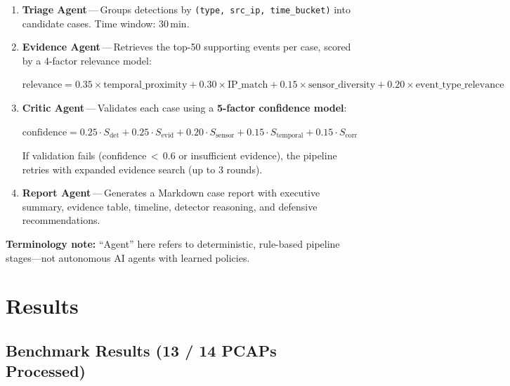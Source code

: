 \documentclass[11pt, a4paper]{article}
\begin{document}
\begin{enumerate}[itemsep=4pt]
    \item \textbf{Triage Agent}\,---\,Groups detections by \texttt{(type, src\_ip, time\_bucket)} into candidate cases. Time window: 30\,min.

    \item \textbf{Evidence Agent}\,---\,Retrieves the top-50 supporting events per case, scored by a 4-factor relevance model:
    \begin{center}\small
    $\text{relevance} = 0.35 \times \text{temporal\_proximity} + 0.30 \times \text{IP\_match} + 0.15 \times \text{sensor\_diversity} + 0.20 \times \text{event\_type\_relevance}$
    \end{center}

    \item \textbf{Critic Agent}\,---\,Validates each case using a \textbf{5-factor confidence model}:
    \begin{center}\small
    $\text{confidence} = 0.25 \cdot S_{\text{det}} + 0.25 \cdot S_{\text{evid}} + 0.20 \cdot S_{\text{sensor}} + 0.15 \cdot S_{\text{temporal}} + 0.15 \cdot S_{\text{corr}}$
    \end{center}
    If validation fails (confidence\,$<$\,0.6 or insufficient evidence), the pipeline retries with expanded evidence search (up to 3 rounds).

    \item \textbf{Report Agent}\,---\,Generates a Markdown case report with executive summary, evidence table, timeline, detector reasoning, and defensive recommendations.
\end{enumerate}

\noindent\textbf{Terminology note:} ``Agent'' here refers to deterministic, rule-based pipeline stages---not autonomous AI agents with learned policies.

\section{Results}

\subsection{Benchmark Results (13 / 14 PCAPs Processed)}
\end{document}
